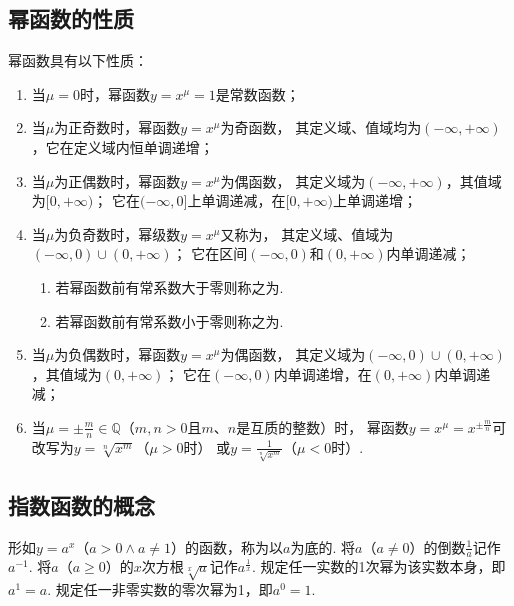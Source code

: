 \subsection{幂函数的性质}
\begin{property}
幂函数具有以下性质：
\begin{enumerate}
	\item 当\(\mu = 0\)时，幂函数\(y=x^{\mu}=1\)是常数函数；

	\item 当\(\mu\)为正奇数时，幂函数\(y=x^{\mu}\)为奇函数，
	其定义域、值域均为\((-\infty,+\infty)\)，它在定义域内恒单调递增；

	\item 当\(\mu\)为正偶数时，幂函数\(y=x^{\mu}\)为偶函数，
	其定义域为\((-\infty,+\infty)\)，其值域为\([0,+\infty)\)；
	它在\((-\infty,0]\)上单调递减，在\([0,+\infty)\)上单调递增；

	\item 当\(\mu\)为负奇数时，幂级数\(y=x^{\mu}\)又称为，
	其定义域、值域为\((-\infty,0)\cup(0,+\infty)\)；
	它在区间\((-\infty,0)\)和\((0,+\infty)\)内单调递减；
	\begin{enumerate}
		\item 若幂函数前有常系数大于零则称之为.
		\item 若幂函数前有常系数小于零则称之为.
	\end{enumerate}

	\item 当\(\mu\)为负偶数时，幂函数\(y=x^{\mu}\)为偶函数，
	其定义域为\((-\infty,0)\cup(0,+\infty)\)，其值域为\((0,+\infty)\)；
	它在\((-\infty,0)\)内单调递增，在\((0,+\infty)\)内单调递减；

	\item 当\(\mu = \pm\frac{m}{n} \in \mathbb{Q}\)（\(m,n>0\)且\(m\)、\(n\)是互质的整数）时，
	幂函数\(y=x^{\mu}=x^{\pm\frac{m}{n}}\)可改写为\(y=\sqrt[n]{x^m}\)（\(\mu>0\)时）
	或\(y=\frac{1}{\sqrt[n]{x^m}}\)（\(\mu<0\)时）.
\end{enumerate}
\end{property}

\subsection{指数函数的概念}
\begin{definition}[指数函数]
形如\(y=a^x\)（\(a>0 \land a \neq 1\)）的函数，称为以\(a\)为底的.
将\(a\)（\(a \neq 0\)）的倒数\(\frac{1}{a}\)记作\(a^{-1}\).
将\(a\)（\(a \geq 0\)）的\(x\)次方根\(\sqrt[x]{a}\)记作\(a^{\frac{1}{x}}\).
规定任一实数的1次幂为该实数本身，即\(a^1=a\).
规定任一非零实数的零次幂为1，即\(a^0=1\).
\end{definition}

